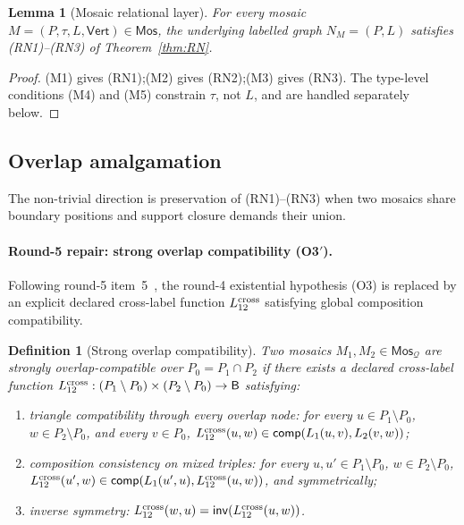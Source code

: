 \documentclass[11pt]{article}
\newtheorem{lemma}[theorem]{Lemma}
\newtheorem{definition}[theorem]{Definition}
\newcommand{\Base}{\mathsf{B}}
\newcommand{\Inv}{\mathsf{inv}}
\newcommand{\comp}{\mathsf{comp}}
\newcommand{\Q}{\mathcal Q}
\newcommand{\Mos}{\mathsf{Mos}}
\newcommand{\Vrt}{\mathsf{Vert}}
\begin{document}
\begin{lemma}[Mosaic relational layer]\label{lem:M-to-RN}
For every mosaic $M=(P,\tau,L,\Vrt)\in\Mos$, the underlying labelled
graph $N_M=(P,L)$ satisfies (RN1)--(RN3) of
Theorem~\ref{thm:RN}.
\end{lemma}

\begin{proof}
(M1) gives (RN1);\@ (M2) gives (RN2);\@ (M3) gives (RN3).  The
type-level conditions (M4) and (M5) constrain $\tau$, not $L$, and
are handled separately below.
\end{proof}

\subsection{Overlap amalgamation}
\label{ssec:overlap}

The non-trivial direction is preservation of (RN1)--(RN3) when two
mosaics share boundary positions and support closure demands their
union.

\paragraph{Round-5 repair: strong overlap compatibility (O3$'$).}
Following round-5 item~5~\cite{GPT55Round5Review}, the round-4
existential hypothesis (O3) is replaced by an explicit declared
cross-label function $L_{12}^{\rm cross}$ satisfying global
composition compatibility.

\begin{definition}[Strong overlap compatibility]\label{def:strong-overlap}
Two mosaics $M_1,M_2\in\Mos_\Q$ are \emph{strongly
overlap-compatible} over $P_0=P_1\cap P_2$ if there exists a
declared cross-label function
\(
  L_{12}^{\rm cross}:(P_1\setminus P_0)\times(P_2\setminus P_0)
                     \to\Base
\)
satisfying:
\begin{enumerate}[label=\textnormal{(O3$'$.\alph*)},leftmargin=3em]
  \item triangle compatibility through every overlap node: for
    every $u\in P_1\setminus P_0$, $w\in P_2\setminus P_0$, and
    every $v\in P_0$, $L_{12}^{\rm cross}(u,w)\in\comp(L_1(u,v),L_2(v,w))$;
  \item composition consistency on mixed triples: for every
    $u,u'\in P_1\setminus P_0$, $w\in P_2\setminus P_0$,
    $L_{12}^{\rm cross}(u',w)\in\comp(L_1(u',u),L_{12}^{\rm cross}(u,w))$,
    and symmetrically;
  \item inverse symmetry: $L_{12}^{\rm cross}(w,u)=\Inv(L_{12}^{\rm cross}(u,w))$.
\end{enumerate}
\end{definition}
\end{document}
